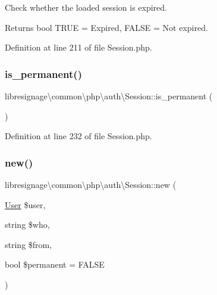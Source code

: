 Check whether the loaded session is expired.

\begin{DoxyReturn}{Returns}
bool T\+R\+UE = Expired, F\+A\+L\+SE = Not expired. 
\end{DoxyReturn}


Definition at line 211 of file Session.\+php.

\mbox{\label{classlibresignage_1_1common_1_1php_1_1auth_1_1Session_aa5b3b169be03446981263193673eee39}} 
\subsubsection{\texorpdfstring{is\+\_\+permanent()}{is\_permanent()}}
{\footnotesize\ttfamily libresignage\textbackslash{}common\textbackslash{}php\textbackslash{}auth\textbackslash{}\+Session\+::is\+\_\+permanent (\begin{DoxyParamCaption}{ }\end{DoxyParamCaption})}



Definition at line 232 of file Session.\+php.

\mbox{\label{classlibresignage_1_1common_1_1php_1_1auth_1_1Session_afe64254ed36226f20232e29dd884f59e}} 
\subsubsection{\texorpdfstring{new()}{new()}}
{\footnotesize\ttfamily libresignage\textbackslash{}common\textbackslash{}php\textbackslash{}auth\textbackslash{}\+Session\+::new (\begin{DoxyParamCaption}\item[{\hyperlink{classlibresignage_1_1common_1_1php_1_1auth_1_1User}{User}}]{\$user,  }\item[{string}]{\$who,  }\item[{string}]{\$from,  }\item[{bool}]{\$permanent = {\ttfamily FALSE} }\end{DoxyParamCaption})}

